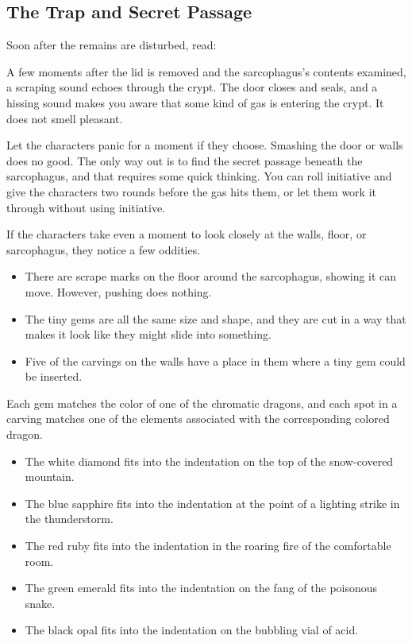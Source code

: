\documentclass[10pt,a4paper,twoside,bg=print,twocolumn,openany,nodeprecatedcode]{dndbook}
\begin{document}
\subsection{The Trap and Secret Passage}
Soon after the remains are disturbed, read:

\begin{DndReadAloud}{}
A few moments after the lid is removed and the sarcophagus's contents examined, a scraping sound echoes through the crypt. The door closes and seals, and a hissing sound makes you aware that some kind of gas is entering the crypt. It does not smell pleasant.

\end{DndReadAloud}

Let the characters panic for a moment if they choose. Smashing the door or walls does no good. The only way out is to find the secret passage beneath the sarcophagus, and that requires some quick thinking. You can roll initiative and give the characters two rounds before the gas hits them, or let them work it through without using initiative.

If the characters take even a moment to look closely at the walls, floor, or sarcophagus, they notice a few oddities.


\begin{itemize}
\item There are scrape marks on the floor around the sarcophagus, showing it can move. However, pushing does nothing.
\item The tiny gems are all the same size and shape, and they are cut in a way that makes it look like they might slide into something.
\item Five of the carvings on the walls have a place in them where a tiny gem could be inserted.
\end{itemize}

Each gem matches the color of one of the chromatic dragons, and each spot in a carving matches one of the elements associated with the corresponding colored dragon.


\begin{itemize}
\item The white diamond fits into the indentation on the top of the snow-covered mountain.
\item The blue sapphire fits into the indentation at the point of a lighting strike in the thunderstorm.
\item The red ruby fits into the indentation in the roaring fire of the comfortable room.
\item The green emerald fits into the indentation on the fang of the poisonous snake.
\item The black opal fits into the indentation on the bubbling vial of acid.
\end{itemize}
\end{document}
